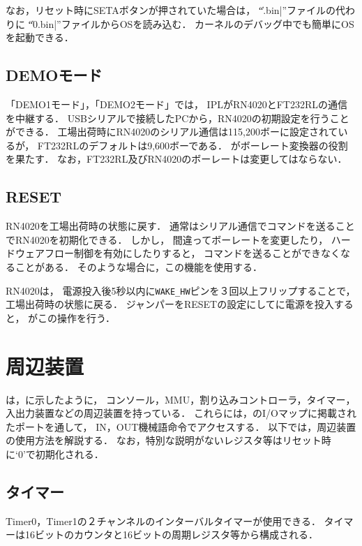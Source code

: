 なお，リセット時にSETAボタンが押されていた場合は，
``\|.bin|''ファイルの代わりに
``\|0.bin|''ファイルからOSを読み込む．
カーネルのデバッグ中でも簡単にOSを起動できる．

\subsection{DEMOモード}
「DEMO1モード」，「DEMO2モード」では，
IPLがRN4020とFT232RLの通信を中継する．
USBシリアルで接続したPCから，RN4020の初期設定を行うことができる．
工場出荷時にRN4020のシリアル通信は115,200ボーに設定されているが，
FT232RLのデフォルトは9,600ボーである．
{\tac}がボーレート変換器の役割を果たす．
なお，FT232RL及びRN4020のボーレートは変更してはならない．

\subsection{RESET}
RN4020を工場出荷時の状態に戻す．
通常はシリアル通信でコマンドを送ることでRN4020を初期化できる．
しかし，
間違ってボーレートを変更したり，
ハードウェアフロー制御を有効にしたりすると，
コマンドを送ることができなくなることがある．
そのような場合に，この機能を使用する．

RN4020は，
電源投入後5秒以内に\texttt{WAKE\_HW}ピンを３回以上フリップすることで，
工場出荷時の状態に戻る．
ジャンパーをRESETの設定にして{\tecS}に電源を投入すると，
{\tac}がこの操作を行う．

\section{周辺装置}
\label{io}

{\tac}は，に示したように，
コンソール，MMU，割り込みコントローラ，タイマー，
入出力装置などの周辺装置を持っている．
これらには，のI/Oマップに掲載されたポートを通して，
IN，OUT機械語命令でアクセスする．
以下では，周辺装置の使用方法を解説する．
なお，特別な説明がないレジスタ等はリセット時に`0'で初期化される．

\subsection{タイマー}
\label{timer}
Timer0，Timer1の２チャンネルのインターバルタイマーが使用できる．
タイマーは16ビットのカウンタと16ビットの周期レジスタ等から構成される．

